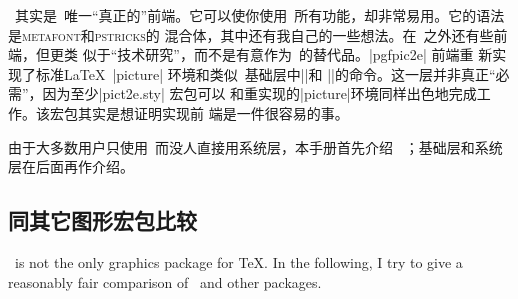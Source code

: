 
\tikzname\ 其实是\pgfname\ 唯一“真正的”前端。它可以使你使用\pgfname\
所有功能，却非常易用。它的语法是\textsc{metafont}和\textsc{pstricks}的
混合体，其中还有我自己的一些想法。在\tikzname\ 之外还有些前端，但更类
似于“技术研究”，而不是有意作为\tikzname\ 的替代品。|pgfpic2e| 前端重
新实现了标准\LaTeX\ |{picture}| 环境和类似\pgfname\ 基础层中|\line|和
|\vector|的命令。这一层并非真正“必需”，因为至少|pict2e.sty| 宏包可以
和重实现的|{picture}|环境同样出色地完成工作。该宏包其实是想证明实现前
端是一件很容易的事。


由于大多数用户只使用\tikzname\ 而没人直接用系统层，本手册首先介绍
\tikzname\ ；基础层和系统层在后面再作介绍。

\subsection{同其它图形宏包比较}

\tikzname\ is not the only graphics package for \TeX. In the following,
I try to give a reasonably fair comparison of \tikzname\ and
other packages.

